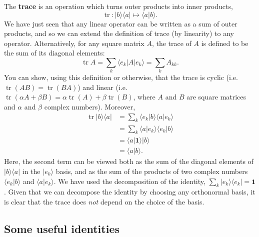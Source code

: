 \documentclass[fleqn]{article}
\begin{document}
The \textbf{trace} is an operation which turns outer products into inner products,
\[
  \operatorname{tr}\colon |b\rangle\langle a| \longmapsto \langle a|b\rangle.
\]
We have just seen that any linear operator can be written as a sum of outer products, and so we can extend the definition of trace (by linearity) to any operator.
Alternatively, for any square matrix \(A\), the trace of \(A\) is defined to be the sum of its diagonal elements:
\[
  \operatorname{tr}A = \sum_k \langle e_k|A|e_k\rangle = \sum_k A_{kk}.
\]
You can show, using this definition or otherwise, that the trace is cyclic (i.e.~\(\operatorname{tr}(AB) = \operatorname{tr}(BA)\)) and linear (i.e.~\(\operatorname{tr}(\alpha A+\beta B) = \alpha\operatorname{tr}(A)+\beta\operatorname{tr}(B)\), where \(A\) and \(B\) are square matrices and \(\alpha\) and \(\beta\) complex numbers).
Moreover,
\[
  \begin{aligned}
    \operatorname{tr}|b\rangle\langle a|
    &= \sum_k \langle e_k|b\rangle\langle a|e_k\rangle
  \\&= \sum_k \langle a|e_k\rangle\langle e_k|b\rangle
  \\&= \langle a|\mathbf{1}\rangle|b\rangle
  \\&= \langle a|b\rangle.
  \end{aligned}
\]
Here, the second term can be viewed both as the sum of the diagonal elements of \(|b\rangle\langle a|\) in the \(|e_k\rangle\) basis, and as the sum of the products of two complex numbers \(\langle e_k|b\rangle\) and \(\langle a|e_k\rangle\).
We have used the decomposition of the identity, \(\sum_k|e_k\rangle\langle e_k|=\mathbf{1}\).
Given that we can decompose the identity by choosing any orthonormal basis, it is clear that the trace does \emph{not} depend on the choice of the basis.

\hypertarget{some-useful-identities}{%
\subsection{Some useful identities}\label{some-useful-identities}}
\end{document}
